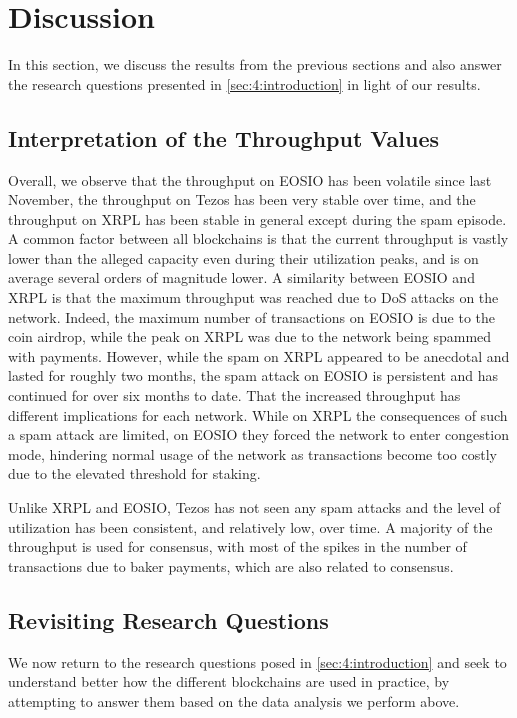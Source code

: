 \section{Discussion}
\label{sec:4:discussion}
In this section, we discuss the results from the previous sections and also answer the research questions presented in \autoref{sec:4:introduction} in light of our results.


\subsection{Interpretation of the Throughput Values}
Overall, we observe that the throughput on EOSIO has been volatile since last November, the throughput on Tezos has been very stable over time, and the throughput on XRPL has been stable in general except during the spam episode.
A common factor between all blockchains is that the current throughput is vastly lower than the alleged capacity even during their utilization peaks, and is on average several orders of magnitude lower.
A similarity between EOSIO and XRPL is that the maximum throughput was reached due to DoS attacks on the network. Indeed, the maximum number of transactions on EOSIO is due to the  coin airdrop, while the peak on XRPL was due to the network being spammed with payments.
However, while the spam on XRPL appeared to be anecdotal and lasted for roughly two months, the spam attack on EOSIO is persistent and has continued for over six months to date.
That the increased throughput has different implications for each network.
While on XRPL the consequences of such a spam attack are limited, on EOSIO they forced the network to enter congestion mode, hindering normal usage of the network as transactions become too costly due to the elevated threshold for staking.

Unlike XRPL and EOSIO, Tezos has not seen any spam attacks and the level of utilization has been consistent, and relatively low, over time. A majority of the throughput is used for consensus, with most of the spikes in the number of transactions due to baker payments, which are also related to consensus.

\subsection{Revisiting Research Questions}
We now return to the research questions posed in \autoref{sec:4:introduction} and seek to understand better how the different blockchains are used in practice, by attempting to answer them based on the data analysis we perform above.

